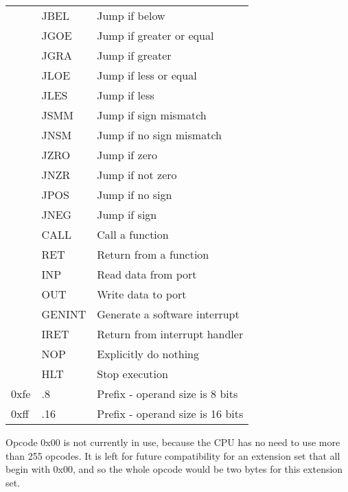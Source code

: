 \documentclass[12pt,a4paper]{report}
\begin{document}
\begin{center}
\begin{longtable}{|>{\rownumber}l|>{\ttfamily}l|l|}
         & JBEL                  & Jump if below                     \\
         & JGOE                  & Jump if greater or equal          \\
         & JGRA                  & Jump if greater                   \\
         & JLOE                  & Jump if less or equal             \\
         & JLES                  & Jump if less                      \\
         & JSMM                  & Jump if sign mismatch             \\
         & JNSM                  & Jump if no sign mismatch          \\
         & JZRO                  & Jump if zero                      \\
         & JNZR                  & Jump if not zero                  \\
         & JPOS                  & Jump if no sign                   \\
         & JNEG                  & Jump if sign                      \\
         & CALL                  & Call a function                   \\
         & RET                   & Return from a function            \\
         & INP                   & Read data from port               \\
         & OUT                   & Write data to port                \\
         & GENINT                & Generate a software interrupt     \\
         & IRET                  & Return from interrupt handler     \\
         & NOP                   & Explicitly do nothing             \\
         & HLT                   & Stop execution \gdef\rownumber{}  \\
    0xfe & .8                    & Prefix - operand size is 8 bits   \\
    0xff & .16                   & Prefix - operand size is 16 bits  \\
    \hline
  \end{longtable}
\end{center}

Opcode 0x00 is not currently in use, because the CPU has no need to use more than 255 opcodes. It is left for future compatibility for an extension set that all begin with 0x00, and so the whole opcode would be two bytes for this extension set.
\end{document}
